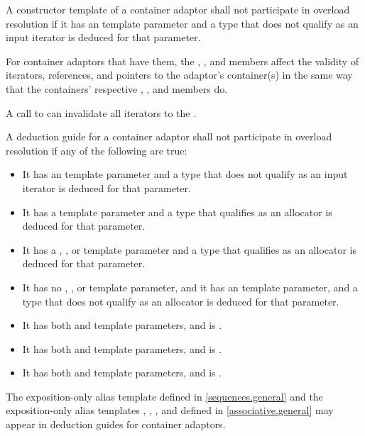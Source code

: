 \pnum
A constructor template of a container adaptor
shall not participate in overload resolution
if it has an  template parameter and
a type that does not qualify as an input iterator is deduced for that parameter.

\pnum
For container adaptors that have them,
the , , and  members
affect the validity of iterators, references, and pointers
to the adaptor's container(s) in the same way that
the containers' respective
, , and  members do.
\begin{example}
A call to 
can invalidate all iterators to the .
\end{example}

\pnum
A deduction guide for a container adaptor shall not participate in overload resolution if any of the following are true:
\begin{itemize}
\item It has an  template parameter and a type that does not qualify as an input iterator is deduced for that parameter.
\item It has a  template parameter and a type that qualifies as an allocator is deduced for that parameter.
\item It has a , , or  template parameter and a type that qualifies as an allocator is deduced for that parameter.
\item It has no , , or  template parameter, and it has an  template parameter, and a type that does not qualify as an allocator is deduced for that parameter.
\item It has both  and  template parameters, and  is .
\item It has both  and  template parameters, and
 is .
\item It has both  and  template parameters, and
 is .
\end{itemize}

\pnum
The exposition-only alias template 
defined in \ref{sequences.general} and
the exposition-only alias templates , ,
, and 
defined in \ref{associative.general}
may appear in deduction guides for container adaptors.

